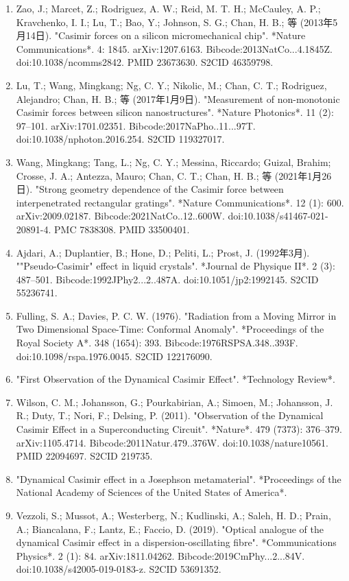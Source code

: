 \begin{enumerate}
\item Zao, J.; Marcet, Z.; Rodriguez, A. W.; Reid, M. T. H.; McCauley, A. P.; Kravchenko, I. I.; Lu, T.; Bao, Y.; Johnson, S. G.; Chan, H. B.; 等 (2013年5月14日). "Casimir forces on a silicon micromechanical chip". *Nature Communications*. 4: 1845. arXiv:1207.6163. Bibcode:2013NatCo...4.1845Z. doi:10.1038/ncomms2842. PMID 23673630. S2CID 46359798.
\item Lu, T.; Wang, Mingkang; Ng, C. Y.; Nikolic, M.; Chan, C. T.; Rodriguez, Alejandro; Chan, H. B.; 等 (2017年1月9日). "Measurement of non-monotonic Casimir forces between silicon nanostructures". *Nature Photonics*. 11 (2): 97–101. arXiv:1701.02351. Bibcode:2017NaPho..11...97T. doi:10.1038/nphoton.2016.254. S2CID 119327017.
\item Wang, Mingkang; Tang, L.; Ng, C. Y.; Messina, Riccardo; Guizal, Brahim; Crosse, J. A.; Antezza, Mauro; Chan, C. T.; Chan, H. B.; 等 (2021年1月26日). "Strong geometry dependence of the Casimir force between interpenetrated rectangular gratings". *Nature Communications*. 12 (1): 600. arXiv:2009.02187. Bibcode:2021NatCo..12..600W. doi:10.1038/s41467-021-20891-4. PMC 7838308. PMID 33500401.
\item Ajdari, A.; Duplantier, B.; Hone, D.; Peliti, L.; Prost, J. (1992年3月). ""Pseudo-Casimir" effect in liquid crystals". *Journal de Physique II*. 2 (3): 487–501. Bibcode:1992JPhy2...2..487A. doi:10.1051/jp2:1992145. S2CID 55236741.
\item Fulling, S. A.; Davies, P. C. W. (1976). "Radiation from a Moving Mirror in Two Dimensional Space-Time: Conformal Anomaly". *Proceedings of the Royal Society A*. 348 (1654): 393. Bibcode:1976RSPSA.348..393F. doi:10.1098/rspa.1976.0045. S2CID 122176090.
\item "First Observation of the Dynamical Casimir Effect". *Technology Review*.
\item Wilson, C. M.; Johansson, G.; Pourkabirian, A.; Simoen, M.; Johansson, J. R.; Duty, T.; Nori, F.; Delsing, P. (2011). "Observation of the Dynamical Casimir Effect in a Superconducting Circuit". *Nature*. 479 (7373): 376–379. arXiv:1105.4714. Bibcode:2011Natur.479..376W. doi:10.1038/nature10561. PMID 22094697. S2CID 219735.
\item "Dynamical Casimir effect in a Josephson metamaterial". *Proceedings of the National Academy of Sciences of the United States of America*.
\item Vezzoli, S.; Mussot, A.; Westerberg, N.; Kudlinski, A.; Saleh, H. D.; Prain, A.; Biancalana, F.; Lantz, E.; Faccio, D. (2019). "Optical analogue of the dynamical Casimir effect in a dispersion-oscillating fibre". *Communications Physics*. 2 (1): 84. arXiv:1811.04262. Bibcode:2019CmPhy...2...84V. doi:10.1038/s42005-019-0183-z. S2CID 53691352.

\end{enumerate}
